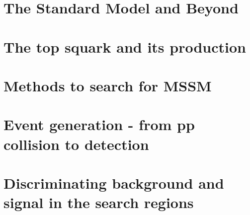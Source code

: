 \documentclass[12pt,a4paper]{report}
\begin{document}
\chapter{The Standard Model and Beyond}
\label{chap:2}


\chapter{The top squark and its production}
\label{chap:3}


\chapter{Methods to search for MSSM}
\label{chap:4}


\chapter{Event generation - from pp collision to detection}
\label{chap:5}




\chapter{Discriminating background and signal in the search regions}
\label{chap:6}

\end{document}
